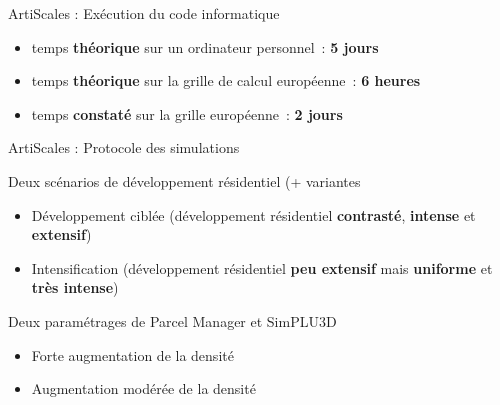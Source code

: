 \documentclass[xcolor=table]{beamer}
\begin{document}
\begin{frame}{ArtiScales : Exécution du code informatique}
\begin{itemize}
	\item temps \textbf{théorique} sur un ordinateur personnel~: \textbf{5 jours}
	\item temps \textbf{théorique} sur la grille de calcul européenne~: \textbf{6 heures}
	\item temps \textbf{constaté} sur la grille européenne~: \textbf{2 jours}
\end{itemize}
\end{frame}

\begin{frame}{ArtiScales : Protocole des simulations}
	\begin{block}{Deux scénarios de développement résidentiel (+ variantes}
		\begin{itemize}
			\small
			\item Développement ciblée (développement résidentiel \textbf{contrasté}, \textbf{intense} et \textbf{extensif})
			\item Intensification (développement résidentiel \textbf{peu extensif} mais \textbf{uniforme} et \textbf{très intense})
		\end{itemize}
	\end{block}
	\begin{block}{Deux paramétrages de Parcel Manager et SimPLU3D}
	\begin{itemize}
		\small
		\item Forte augmentation de la densité
		\item Augmentation modérée de la densité
	\end{itemize}
	\end{block}
\end{frame}
\end{document}

